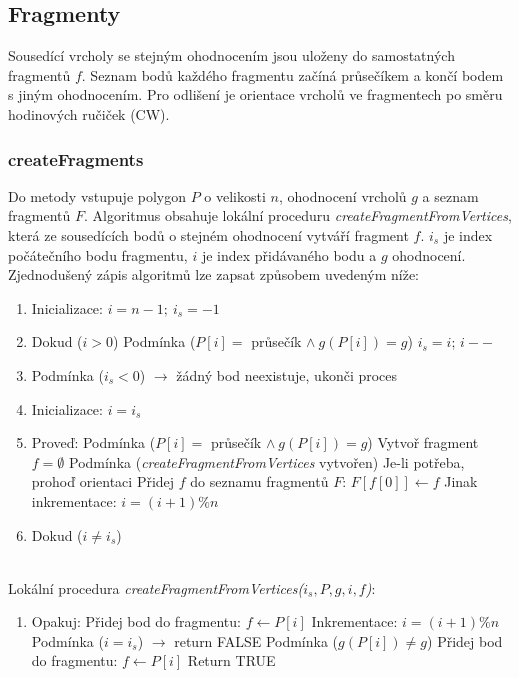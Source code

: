 \documentclass[a4paper, 12pt]{article}
\begin{document}
\subsection{Fragmenty}
Sousedící vrcholy se stejným ohodnocením jsou uloženy do samostatných fragmentů $f$. Seznam bodů každého fragmentu začíná průsečíkem a končí bodem s jiným ohodnocením. Pro odlišení je orientace vrcholů ve fragmentech po směru hodinových ručiček (CW). 

\subsubsection{createFragments}
Do metody vstupuje polygon $P$ o velikosti $n$, ohodnocení vrcholů $g$ a seznam fragmentů $F$. Algoritmus obsahuje lokální proceduru \textit{createFragmentFromVertices}, která ze sousedících bodů o stejném ohodnocení vytváří fragment $f$. $i_s$ je index počátečního bodu fragmentu, $i$ je index přidávaného bodu a $g$ ohodnocení.\\

Zjednodušený zápis algoritmů lze zapsat způsobem uvedeným níže:
\begin{enumerate}
\item Inicializace: $i = n-1;~i_s = -1$
\item Dokud ($i > 0$)
\subitem Podmínka ($P[i] =$ průsečík $\land~g(P[i]) = g$)
\subitem \hspace {0.5cm} $i_s = i$; $i--$ 
\item Podmínka ($i_s < 0$) $\rightarrow$ žádný bod neexistuje, ukonči proces
\item Inicializace: $i = i_s$
\item Proveď: 
\subitem Podmínka ($P[i] =$ průsečík $\land~g(P[i]) = g$)
\subitem \hspace {0.5cm} Vytvoř fragment $f = \emptyset$ 
\subitem \hspace {0.5cm} Podmínka (\textit{createFragmentFromVertices} vytvořen)
\subitem \hspace {1cm} Je-li potřeba, prohoď orientaci
\subitem \hspace {1cm} Přidej $f$ do seznamu fragmentů $F$: $F[f[0]] \leftarrow f$
\subitem Jinak inkrementace: $i = (i+1)\%n$
\item[] Dokud ($i \neq i_s$)
\end{enumerate}
~\\

Lokální procedura \textit{createFragmentFromVertices($i_s, P, g, i, f$)}:
\begin{enumerate}
\item[] Opakuj:
\subitem Přidej bod do fragmentu: $f \leftarrow P[i]$
\subitem Inkrementace: $i = (i+1)\%n$
\subitem Podmínka ($i = i_s$) $\rightarrow$ return FALSE
\subitem Podmínka ($g(P[i]) \neq g$)
\subitem \hspace {0.5cm} Přidej bod do fragmentu: $f \leftarrow P[i]$
\subitem \hspace {0.5cm} Return TRUE
\end{enumerate}
\end{document}
